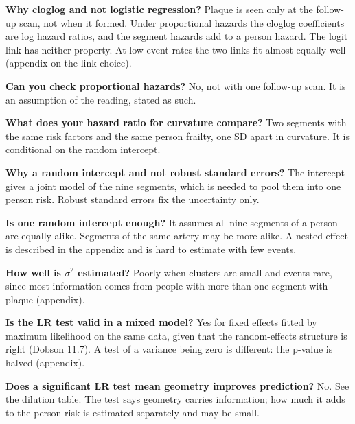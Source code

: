 \documentclass[11pt]{article}
\begin{document}
\textbf{Why cloglog and not logistic regression?} Plaque is seen only at the follow-up scan, not
when it formed. Under proportional hazards the cloglog coefficients are log hazard ratios, and the
segment hazards add to a person hazard. The logit link has neither property. At low event rates
the two links fit almost equally well (appendix on the link choice).

\textbf{Can you check proportional hazards?} No, not with one follow-up scan. It is an assumption
of the reading, stated as such.

\textbf{What does your hazard ratio for curvature compare?} Two segments with the same risk factors
and the same person frailty, one SD apart in curvature. It is conditional on the random intercept.

\textbf{Why a random intercept and not robust standard errors?} The intercept gives a joint model
of the nine segments, which is needed to pool them into one person risk. Robust standard errors fix
the uncertainty only.

\textbf{Is one random intercept enough?} It assumes all nine segments of a person are equally
alike. Segments of the same artery may be more alike. A nested effect is described in the appendix
and is hard to estimate with few events.

\textbf{How well is $\sigma^2$ estimated?} Poorly when clusters are small and events rare, since
most information comes from people with more than one segment with plaque (appendix).

\textbf{Is the LR test valid in a mixed model?} Yes for fixed effects fitted by maximum likelihood
on the same data, given that the random-effects structure is right (Dobson 11.7). A test of a
variance being zero is different: the p-value is halved (appendix).

\textbf{Does a significant LR test mean geometry improves prediction?} No. See the dilution table.
The test says geometry carries information; how much it adds to the person risk is estimated
separately and may be small.
\end{document}
